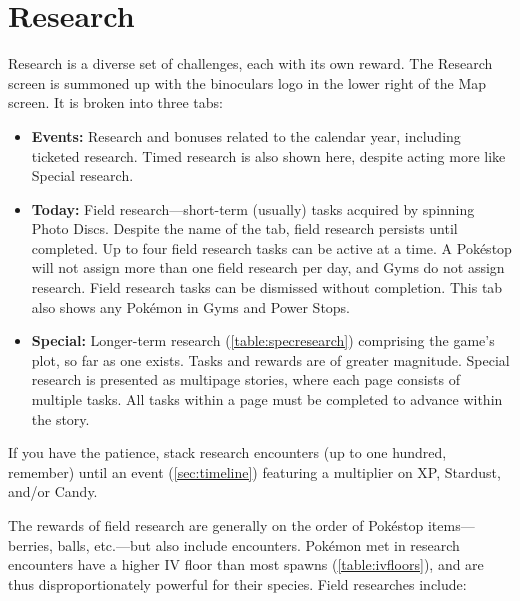 %

\section{Research\label{sec:research}}
Research is a diverse set of challenges, each with its own reward.
The Research screen is summoned up with the binoculars logo in the lower right of the Map screen.
It is broken into three tabs:
\begin{itemize}
  \item \textbf{Events:} Research and bonuses related to the calendar year, including ticketed research.
    Timed research is also shown here, despite acting more like Special research.
  \item \textbf{Today:} Field research---short-term (usually) tasks acquired by spinning Photo Discs.
    Despite the name of the tab, field research persists until completed.
    Up to four field research tasks can be active at a time.
    A Pokéstop will not assign more than one field research per day, and Gyms do not assign research.
    Field research tasks can be dismissed without completion.
    This tab also shows any Pokémon in Gyms and Power Stops.
  \item \textbf{Special:} Longer-term research (\autoref{table:specresearch}) comprising the game's plot, so far as one exists.
    Tasks and rewards are of greater magnitude.
    Special research is presented as multipage stories, where each page consists of multiple tasks.
    All tasks within a page must be completed to advance within the story.
\end{itemize}
\begin{tipbox}[title=Maximizing the value of research encounters]
If you have the patience, stack research encounters (up to one hundred, remember) until
an event (\autoref{sec:timeline}) featuring a multiplier on XP, Stardust, and/or Candy.
\end{tipbox}
The rewards of field research are generally on the order of Pokéstop items---berries, balls,
 etc.---but also include encounters.
Pokémon met in research encounters have a higher IV floor than most spawns (\autoref{table:ivfloors}),
  and are thus disproportionately powerful for their species.
Field researches include:
